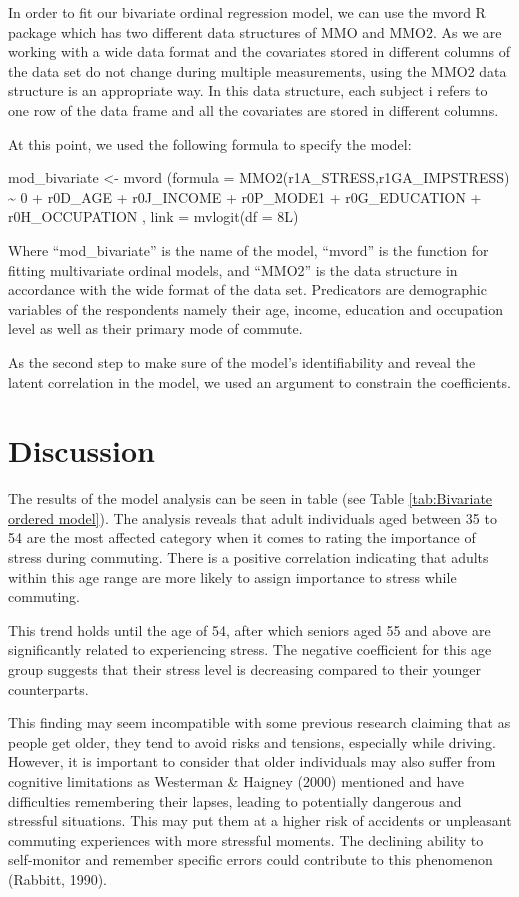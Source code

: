 \documentclass[
11pt, %
oneside, %
english, %
singlespacing, %
]{macthesis} %
\begin{document}
In order to fit our bivariate ordinal regression model, we can use the mvord R package which has two different data structures of MMO and MMO2. As we are working with a wide data format and the covariates stored in different columns of the data set do not change during multiple measurements, using the MMO2 data structure is an appropriate way. In this data structure, each subject i refers to one row of the data frame and all the covariates are stored in different columns.

At this point, we used the following formula to specify the model:

mod\_bivariate \textless- mvord (formula = MMO2(r1A\_STRESS,r1GA\_IMPSTRESS) \textasciitilde{} 0 + r0D\_AGE + r0J\_INCOME + r0P\_MODE1 + r0G\_EDUCATION + r0H\_OCCUPATION ,
link = mvlogit(df = 8L)

Where ``mod\_bivariate'' is the name of the model, ``mvord'' is the function for fitting multivariate ordinal models, and ``MMO2'' is the data structure in accordance with the wide format of the data set. Predicators are demographic variables of the respondents namely their age, income, education and occupation level as well as their primary mode of commute.

As the second step to make sure of the model's identifiability and reveal the latent correlation in the model, we used an argument to constrain the coefficients.

\hypertarget{discussion}{%
\section{Discussion}\label{discussion}}

The results of the model analysis can be seen in table (see Table \ref{tab:Bivariate ordered model}). The analysis reveals that adult individuals aged between 35 to 54 are the most affected category when it comes to rating the importance of stress during commuting. There is a positive correlation indicating that adults within this age range are more likely to assign importance to stress while commuting.

This trend holds until the age of 54, after which seniors aged 55 and above are significantly related to experiencing stress. The negative coefficient for this age group suggests that their stress level is decreasing compared to their younger counterparts.

This finding may seem incompatible with some previous research claiming that as people get older, they tend to avoid risks and tensions, especially while driving. However, it is important to consider that older individuals may also suffer from cognitive limitations as Westerman \& Haigney (2000) mentioned and have difficulties remembering their lapses, leading to potentially dangerous and stressful situations. This may put them at a higher risk of accidents or unpleasant commuting experiences with more stressful moments. The declining ability to self-monitor and remember specific errors could contribute to this phenomenon (Rabbitt, 1990).
\end{document}
